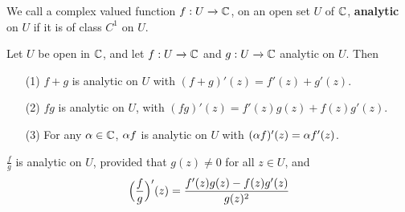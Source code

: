\begin{definition}
    We call a complex valued function $f:U \xrightarrow{} \mathbb{C}$, on an open set
    $U$ of $\mathbb{C}$, \textbf{analytic} on $U$ if it is of class  $C^1$ on  $U$.
\end{definition}

\begin{theorem}\label{3.2.2}
    Let $U$ be open in  $\mathbb{C}$, and let  $f:U \xrightarrow{} \mathbb{C}$ and $g:U
    \xrightarrow{} \mathbb{C}$ analytic on $U$. Then
    \begin{enumerate}
        \item[(1)] $f+g$ is analytic on  $U$ with $(f+g)'(z)=f'(z)+g'(z)$.

        \item[(2)] $fg$ is analytic on  $U$, with
            $(fg)'(z)=f'(z)g(z)+f(z)g'(z)$.

        \item[(3)] For any $\alpha \in \mathbb{C}$,  $\alpha f$ is analytic on  $U$ with $(\alpha
            f)'(z)=\alpha f'(z)$.
    \end{enumerate}
\end{theorem}
\begin{corollary}
    $\frac{f}{g}$ is analytic on $U$, provided that  $g(z) \neq 0$ for all $z
    \in U$, and
    \begin{equation*}
        \Big{(} \frac{f}{g} \Big{)}'(z)=\frac{f'(z)g(z)-f(z)g'(z)}{g(z)^2}
    \end{equation*}
\end{corollary}

